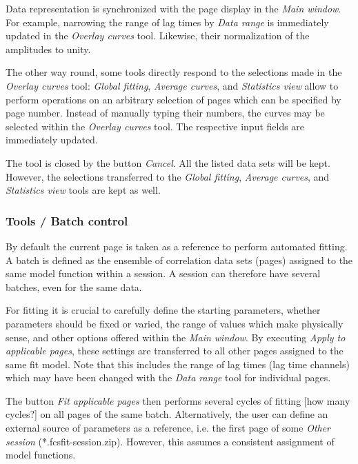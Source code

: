 Data representation is synchronized with the page display in the \textit{Main window}. For example, narrowing the range of lag times by \textit{Data range }is immediately updated in the \textit{Overlay curves }tool. Likewise, their normalization of the amplitudes to unity.

The other way round, some tools directly respond to the selections made in the \textit{Overlay curves} tool: \textit{Global fitting}, \textit{Average curves}, and \textit{Statistics view} allow to perform operations on an arbitrary selection of pages which can be specified by page number. Instead of manually typing their numbers, the curves may be selected within the \textit{Overlay curves} tool. The respective input fields are immediately updated.

The tool is closed by the button \textit{Cancel}. All the listed data sets will be kept. However, the selections transferred to the \textit{Global fitting}, \textit{Average curves}, and \textit{Statistics view} tools are kept as well.

\subsubsection{Tools / Batch control}
\label{sec:tm.bc}
By default the current page is taken as a reference to perform automated fitting. A batch is defined as the ensemble of correlation data sets (pages) assigned to the same model function within a session. A session can therefore have several batches, even for the same data. 

For fitting it is crucial to carefully define the starting parameters, whether parameters should be fixed or varied, the range of values which make physically sense, and other options offered within the \textit{Main window}. By executing \textit{Apply to applicable pages}, these settings are transferred to all other pages assigned to the same fit model. Note that this includes the range of lag times (lag time channels) which may have been changed with the \textit{Data range }tool for individual pages.

The button \textit{Fit applicable pages} then performs several cycles of fitting [how many cycles?] on all pages of the same batch. Alternatively, the user can define an external source of parameters as a reference, i.e. the first page of some \textit{Other session} (*.fcsfit-session.zip). However, this assumes a consistent assignment of model functions.

